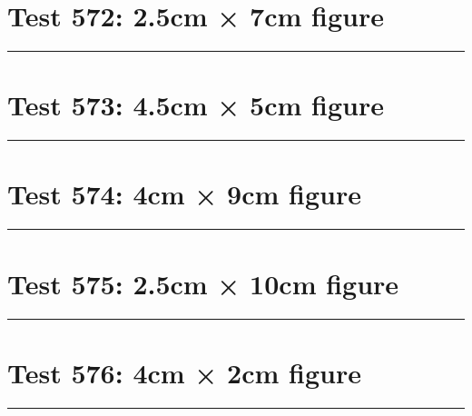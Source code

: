 \documentclass[a4paper,11pt]{article}
\begin{document}
\section*{Test 572: 2.5cm × 7cm figure}
\begin{swarmwrap}%
  \begin{minipage}[t]{2cm}
    \centering
    \rule{\linewidth}{7cm}
  \end{minipage}%
\end{swarmwrap}%
\swarmwrapnext
\lipsum[31]
\lipsum[32]
\lipsum[33]
\lipsum[34]
\lipsum[35]
\lipsum[36]
\section*{Test 573: 4.5cm × 5cm figure}
\begin{swarmwrap}%
  \begin{minipage}[t]{4cm}
    \centering
    \rule{\linewidth}{5cm}
  \end{minipage}%
\end{swarmwrap}%
\swarmwrapnext
\lipsum[25]
\lipsum[26]
\lipsum[27]
\lipsum[28]
\lipsum[29]
\lipsum[30]
\section*{Test 574: 4cm × 9cm figure}
\begin{swarmwrap}%
  \begin{minipage}[t]{4cm}
    \centering
    \rule{\linewidth}{9cm}
  \end{minipage}%
\end{swarmwrap}%
\swarmwrapnext
\lipsum[118]
\lipsum[119]
\lipsum[120]
\section*{Test 575: 2.5cm × 10cm figure}
\begin{swarmwrap}%
  \begin{minipage}[t]{2cm}
    \centering
    \rule{\linewidth}{10cm}
  \end{minipage}%
\end{swarmwrap}%
\swarmwrapnext
\lipsum[118]
\lipsum[119]
\lipsum[120]
\lipsum[121]
\lipsum[122]
\lipsum[123]
\section*{Test 576: 4cm × 2cm figure}
\begin{swarmwrap}%
  \begin{minipage}[t]{4cm}
    \centering
    \rule{\linewidth}{2cm}
  \end{minipage}%
\end{swarmwrap}%
\swarmwrapnext
\lipsum[80]
\lipsum[81]
\lipsum[82]
\lipsum[83]
\lipsum[84]
\lipsum[85]
\end{document}
